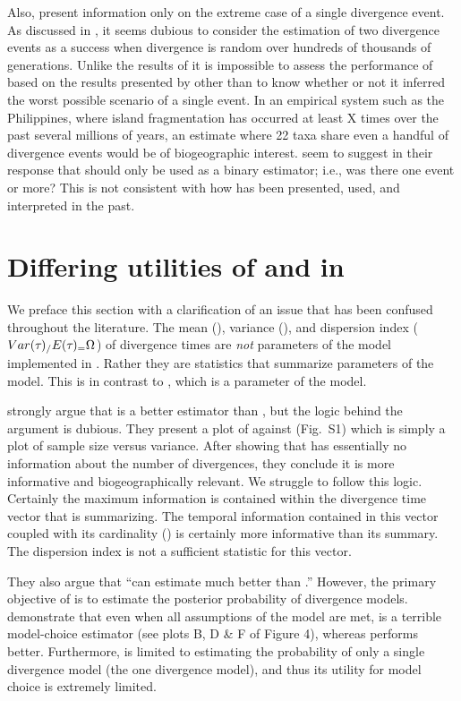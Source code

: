 \documentclass[letterpaper,12pt]{article}
\begin{document}
\begin{linenumbers}
Also, \citet{Hickerson2013} present information only on the extreme case of a
single divergence event.
As discussed in \citet{Oaks2012}, it seems dubious to consider the estimation
of two divergence events as a success when divergence is random over hundreds
of thousands of generations.
Unlike the results of \citet{Oaks2012} it is impossible to assess the
performance of \msb based on the results presented by \cite{Hickerson2013}
other than to know whether or not it inferred the worst possible scenario of a
single event.
In an empirical system such as the Philippines, where island fragmentation
has occurred at least X times over the past several millions of years, an
estimate where 22 taxa share even a handful of divergence events would be
of biogeographic interest.
\citet{Hickerson2013} seem to suggest in their response that \msb should only
be used as a binary estimator; i.e., was there one event or more?
This is not consistent with how \msb has been presented, used, and interpreted
in the past.


\section*{Differing utilities of \numt{} and \vmratio{} in \msb}
We preface this section with a clarification of an issue that has
been confused throughout the \msb literature.
The mean (\meant{}), variance (\vart{}), and dispersion index
($Var(\tau_{}{})_{/}E(\tau_{})_{=} \Omega_{}$) of divergence times are \emph{not} parameters
of the model implemented in \msb.
Rather they are statistics that summarize parameters of the model.
This is in contrast to \numt{}, which is a parameter of the model.

\citet{Hickerson2013} strongly argue that \vmratio{} is a better estimator than
\numt{}, but the logic behind the argument is dubious.
They present a plot of \numt{} against \vmratio{} (Fig.~S1) which is simply a
plot of sample size versus variance.
After showing that \vmratio{} has essentially no information about the
number of divergences, they conclude it is more informative and biogeographically
relevant.
We struggle to follow this logic.
Certainly the maximum information is contained within the divergence time
vector that \vmratio{} is summarizing.
The temporal information contained in this vector coupled with its cardinality
(\numt{}) is certainly more informative than its summary.
The dispersion index is not a sufficient statistic for this vector.

They also argue that ``\msb can estimate \vmratio{} much better than \numt{}.''
However, the primary objective of \msb is to estimate the posterior probability
of divergence models.
\citet{Oaks2012} demonstrate that even when all assumptions of the model are
met, \vmratio is a terrible model-choice estimator (see plots B, D \& F of
Figure 4), whereas \numt{} performs better.
Furthermore, \vmratio{} is limited to estimating the probability of only a
single divergence model (the one divergence model), and thus its utility for
model choice is extremely limited.




\end{linenumbers}
\end{document}
